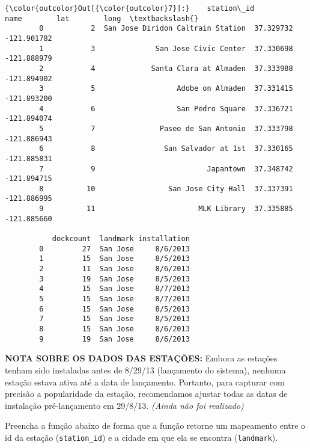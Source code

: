 \documentclass[11pt]{article}
\begin{document}
\begin{Verbatim}[commandchars=\\\{\}]
{\color{outcolor}Out[{\color{outcolor}7}]:}    station\_id                               name        lat        long  \textbackslash{}
        0           2  San Jose Diridon Caltrain Station  37.329732 -121.901782   
        1           3              San Jose Civic Center  37.330698 -121.888979   
        2           4             Santa Clara at Almaden  37.333988 -121.894902   
        3           5                   Adobe on Almaden  37.331415 -121.893200   
        4           6                   San Pedro Square  37.336721 -121.894074   
        5           7               Paseo de San Antonio  37.333798 -121.886943   
        6           8                San Salvador at 1st  37.330165 -121.885831   
        7           9                          Japantown  37.348742 -121.894715   
        8          10                 San Jose City Hall  37.337391 -121.886995   
        9          11                        MLK Library  37.335885 -121.885660   
        
           dockcount  landmark installation  
        0         27  San Jose     8/6/2013  
        1         15  San Jose     8/5/2013  
        2         11  San Jose     8/6/2013  
        3         19  San Jose     8/5/2013  
        4         15  San Jose     8/7/2013  
        5         15  San Jose     8/7/2013  
        6         15  San Jose     8/5/2013  
        7         15  San Jose     8/5/2013  
        8         15  San Jose     8/6/2013  
        9         19  San Jose     8/6/2013  
\end{Verbatim}
            
    \textbf{NOTA SOBRE OS DADOS DAS ESTAÇÕES:} Embora as estações tenham
sido instaladas antes de 8/29/13 (lançamento do sistema), nenhuma
estação estava ativa até a data de lançamento. Portanto, para capturar
com precisão a popularidade da estação, recomendamos ajustar todas as
datas de instalação pré-lançamento em 29/8/13. \emph{(Ainda não foi
realizado)}

    Preencha a função abaixo de forma que a função retorne um mapeamento
entre o id da estação (\texttt{station\_id}) e a cidade em que ela se
encontra (\texttt{landmark}).
\end{document}
